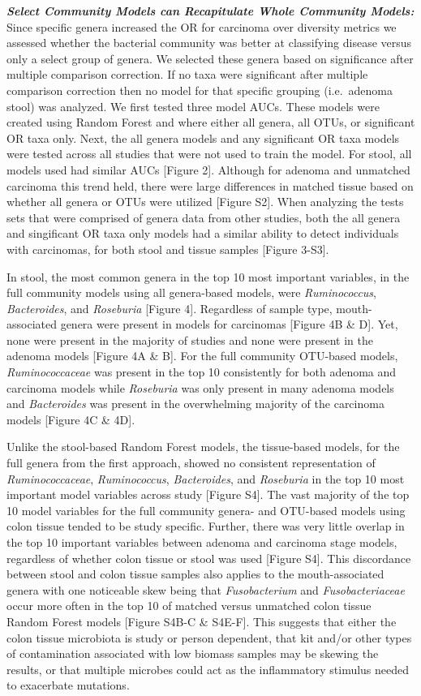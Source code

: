 \documentclass[12pt,]{article}
\begin{document}
\textbf{\emph{Select Community Models can Recapitulate Whole Community
Models:}} Since specific genera increased the OR for carcinoma over
diversity metrics we assessed whether the bacterial community was better
at classifying disease versus only a select group of genera. We selected
these genera based on significance after multiple comparison correction.
If no taxa were significant after multiple comparison correction then no
model for that specific grouping (i.e.~adenoma stool) was analyzed. We
first tested three model AUCs. These models were created using Random
Forest and where either all genera, all OTUs, or significant OR taxa
only. Next, the all genera models and any significant OR taxa models
were tested across all studies that were not used to train the model.
For stool, all models used had similar AUCs {[}Figure 2{]}. Although for
adenoma and unmatched carcinoma this trend held, there were large
differences in matched tissue based on whether all genera or OTUs were
utilized {[}Figure S2{]}. When analyzing the tests sets that were
comprised of genera data from other studies, both the all genera and
singificant OR taxa only models had a similar ability to detect
individuals with carcinomas, for both stool and tissue samples {[}Figure
3-S3{]}.

In stool, the most common genera in the top 10 most important variables,
in the full community models using all genera-based models, were
\emph{Ruminococcus}, \emph{Bacteroides}, and \emph{Roseburia} {[}Figure
4{]}. Regardless of sample type, mouth-associated genera were present in
models for carcinomas {[}Figure 4B \& D{]}. Yet, none were present in
the majority of studies and none were present in the adenoma models
{[}Figure 4A \& B{]}. For the full community OTU-based models,
\emph{Ruminococcaceae} was present in the top 10 consistently for both
adenoma and carcinoma models while \emph{Roseburia} was only present in
many adenoma models and \emph{Bacteroides} was present in the
overwhelming majority of the carcinoma models {[}Figure 4C \& 4D{]}.

Unlike the stool-based Random Forest models, the tissue-based models,
for the full genera from the first approach, showed no consistent
representation of \emph{Ruminococcaceae}, \emph{Ruminococcus},
\emph{Bacteroides}, and \emph{Roseburia} in the top 10 most important
model variables across study {[}Figure S4{]}. The vast majority of the
top 10 model variables for the full community genera- and OTU-based
models using colon tissue tended to be study specific. Further, there
was very little overlap in the top 10 important variables between
adenoma and carcinoma stage models, regardless of whether colon tissue
or stool was used {[}Figure S4{]}. This discordance between stool and
colon tissue samples also applies to the mouth-associated genera with
one noticeable skew being that \emph{Fusobacterium} and
\emph{Fusobacteriaceae} occur more often in the top 10 of matched versus
unmatched colon tissue Random Forest models {[}Figure S4B-C \& S4E-F{]}.
This suggests that either the colon tissue microbiota is study or person
dependent, that kit and/or other types of contamination associated with
low biomass samples may be skewing the results, or that multiple
microbes could act as the inflammatory stimulus needed to exacerbate
mutations.
\end{document}
